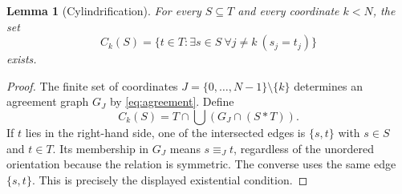 \documentclass[11pt,a4paper]{article}
\numberwithin{equation}{section}
\newtheorem{lemma}[theorem]{Lemma}
\newcommand{\up}[2]{\{#1,#2\}}
\newcommand{\UnProd}{\mathbin{\ast}}
\begin{document}
\begin{lemma}[Cylindrification]\label{lem:cyl}
For every $S\subseteq T$ and every coordinate $k<N$, the set
\[
C_k(S)=\{t\in T:\exists s\in S\ \forall j\ne k\ (s_j=t_j)\}
\]
exists.
\end{lemma}
\begin{proof}
The finite set of coordinates $J=\{0,\ldots,N-1\}\setminus\{k\}$ determines an agreement graph $G_J$ by \eqref{eq:agreement}.  Define
\begin{equation}\label{eq:cyl}
C_k(S)=T\cap\bigcup\left(G_J\cap(S\UnProd T)\right).
\end{equation}
If $t$ lies in the right-hand side, one of the intersected edges is $\up st$ with $s\in S$ and $t\in T$.  Its membership in $G_J$ means $s\equiv_Jt$, regardless of the unordered orientation because the relation is symmetric.  The converse uses the same edge $\up st$.  This is precisely the displayed existential condition.
\end{proof}
\end{document}
